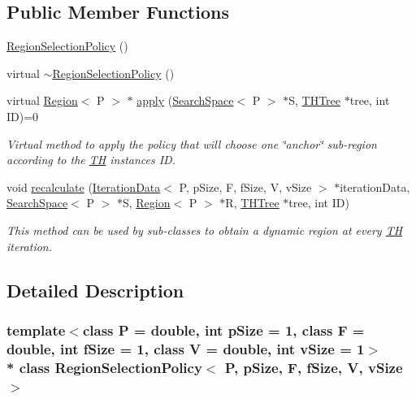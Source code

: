 \subsection*{Public Member Functions}
\begin{DoxyCompactItemize}
\item 
\hyperlink{classRegionSelectionPolicy_a62f08e7286d9bc86ca2f66f07372a513}{Region\+Selection\+Policy} ()
\item 
virtual \hyperlink{classRegionSelectionPolicy_a1a6db1114b3994f1d766f808a1d8616c}{$\sim$\+Region\+Selection\+Policy} ()
\item 
virtual \hyperlink{classRegion}{Region}$<$ P $>$ $\ast$ \hyperlink{classRegionSelectionPolicy_add02b5dae00356db700d37e10c025d26}{apply} (\hyperlink{classSearchSpace}{Search\+Space}$<$ P $>$ $\ast$S, \hyperlink{classTHTree}{T\+H\+Tree} $\ast$tree, int ID)=0
\begin{DoxyCompactList}\small\item\em Virtual method to apply the policy that will choose one \char`\"{}anchor\char`\"{} sub-\/region according to the \hyperlink{classTH}{TH} instance\textquotesingle{}s ID. \end{DoxyCompactList}\item 
void \hyperlink{classRegionSelectionPolicy_a7e6a0b2d2dee3eceae9cd3b16e5f01ca}{recalculate} (\hyperlink{structIterationData}{Iteration\+Data}$<$ P, p\+Size, F, f\+Size, V, v\+Size $>$ $\ast$iteration\+Data, \hyperlink{classSearchSpace}{Search\+Space}$<$ P $>$ $\ast$S, \hyperlink{classRegion}{Region}$<$ P $>$ $\ast$R, \hyperlink{classTHTree}{T\+H\+Tree} $\ast$tree, int ID)
\begin{DoxyCompactList}\small\item\em This method can be used by sub-\/classes to obtain a dynamic region at every \hyperlink{classTH}{TH} iteration. \end{DoxyCompactList}\end{DoxyCompactItemize}


\subsection{Detailed Description}
\subsubsection*{template$<$class P = double, int p\+Size = 1, class F = double, int f\+Size = 1, class V = double, int v\+Size = 1$>$\\*
class Region\+Selection\+Policy$<$ P, p\+Size, F, f\+Size, V, v\+Size $>$}

